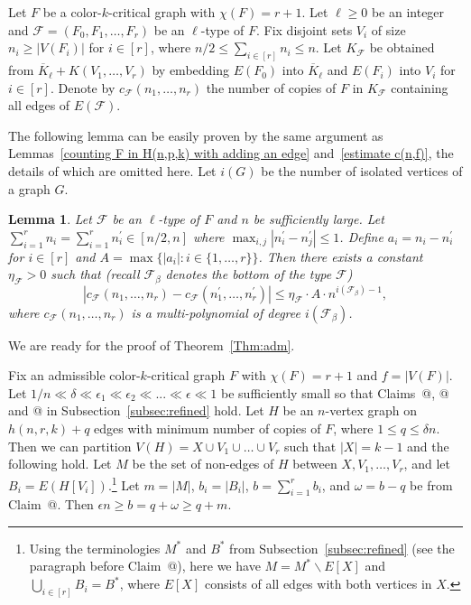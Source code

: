 \documentclass[10pt]{article}
\makeatletter
\newtheorem{lemma}[theorem]{Lemma}
\newcommand*{\rom}[1]{\expandafter\@slowromancap\romannumeral #1@}
\makeatother
\begin{document}
Let $F$ be a color-$k$-critical graph with $\chi(F)=r+1$.
Let $\ell\geq 0$ be an integer and $\mathcal{F}=(F_0, F_1,\ldots,F_r)$ be an $\ell$-type of $F$.
Fix disjoint sets $V_i$ of size $n_i\geq |V(F_i)|$ for $i\in [r]$, where $n/2\leq \sum_{i\in [r]} n_i\leq n$.
Let $K_\mathcal{F}$ be obtained from $\overline{K}_{\ell}+K(V_1,\ldots,V_r)$ by embedding $E(F_0)$ into $\overline{K}_{\ell}$ and $E(F_i)$ into $V_i$ for $i\in [r]$.
Denote by $c_{\mathcal{F}}(n_1,\ldots,n_r)$ the number of copies of $F$ in $K_\mathcal{F}$ containing all edges of $E(\mathcal{F})$.

The following lemma can be easily proven by the same argument as Lemmas~\ref{counting F in H(n,p,k) with adding an edge} and~\ref{estimate c(n,f)}, the details of which are omitted here.
Let $i(G)$ be the number of isolated vertices of a graph $G$.

\begin{lemma}\label{the number copies in l-type}
Let $\mathcal{F}$ be an $\ell$-type of $F$ and $n$ be sufficiently large.
Let $\sum_{i=1}^r n_i=\sum_{i=1}^rn^\prime_i\in [n/2,n]$ where $\max_{i,j} |n^\prime_i-n^\prime_j|\leq 1$.
Define $a_i=n_i-n^\prime_i$ for $i\in[r]$ and $ A=\max\{|a_i|: i\in\{1,\ldots,r\} \}$.
Then there exists a constant $\eta_\mathcal{F}>0$ such that (recall $\mathcal{F}_\beta$ denotes the bottom of the type $\mathcal{F}$)
$$|c_{\mathcal{F}}(n_1,\ldots,n_r)-c_{\mathcal{F}}(n^\prime_1,\ldots,n^\prime_r)|\leq \eta_\mathcal{F}\cdot A \cdot n^{i(\mathcal{F}_\beta)-1},$$
where $c_{\mathcal{F}}(n_1,\ldots,n_r)$ is a multi-polynomial of degree $i(\mathcal{F}_\beta)$.
\end{lemma}

We are ready for the proof of Theorem~\ref{Thm:adm}.

\medskip

Fix an admissible color-$k$-critical graph $F$ with $\chi(F)=r+1$ and $f=|V(F)|$.
Let $1/n\ll \delta\ll \epsilon_1\ll \epsilon_2\ll ... \ll \epsilon\ll 1$ be sufficiently small so that Claims~\rom{1}, \rom{2} and \rom{3} in Subsection~\ref{subsec:refined} hold.
Let $H$ be an $n$-vertex graph on $h(n,r,k)+q$ edges with minimum number of copies of $F$, where $1\leq q\leq \delta n$.
Then we can partition $V(H)=X\cup V_1\cup \ldots \cup V_r$ such that $|X|=k-1$ and the following hold.
Let $M$ be the set of non-edges of $H$ between $X, V_1,\ldots, V_r$, and let $B_i=E(H[V_i])$.\footnote{Using the terminologies $M^*$ and $B^*$ from Subsection~\ref{subsec:refined} (see the paragraph before Claim~\rom{2}), here we have $M=M^*\backslash E[X]$ and $\bigcup_{i\in [r]} B_i=B^*$, where $E[X]$ consists of all edges with both vertices in $X$.}
Let $m=|M|$, $b_i=|B_i|$, $b=\sum_{i=1}^{r}b_i$, and $\omega=b-q$ be from Claim~\rom{3}.
Then $\epsilon n\geq b=q+\omega\geq q+m$.
\end{document}
